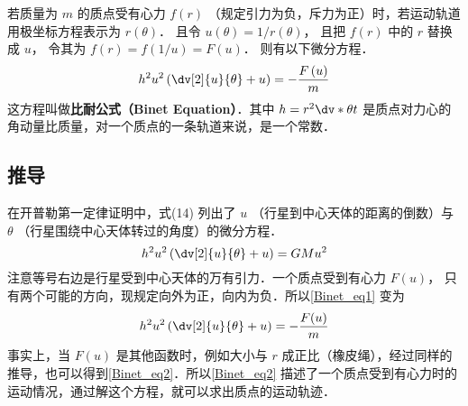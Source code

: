 

若质量为 $m$ 的质点受有心力 $f\left( r \right)$ （规定引力为负，斥力为正）时，若运动轨道用极坐标方程表示为 $r\left( \theta  \right)$． 且令 $u\left( \theta  \right) = 1/{r\left( \theta  \right)}$， 且把 $f\left( r \right)$ 中的 $r$ 替换成 $u$， 令其为
 $f\left( r \right) = f(1/u) = F\left( u \right)$． 则有以下微分方程．
 \begin{equation}
{h^2}{u^2}\left( {\dv[2]{u}{\theta} + u} \right) = -\frac{F\left( u \right)}{m}
\end{equation} 
这方程叫做\textbf{比耐公式（Binet Equation）}．其中 $h = {r^2} \dv*{\theta}{t}$ 是质点对力心的角动量比质量，对一个质点的一条轨道来说，是一个常数．

\subsection{推导}
在开普勒第一定律证明中，式(14)%
列出了 $u$ （行星到中心天体的距离的倒数）与 $\theta $ （行星围绕中心天体转过的角度）的微分方程． 
\begin{equation}\label{Binet_eq1}
{h^2}{u^2}\left( {\dv[2]{u}{\theta} + u} \right) =  GM{u^2}
\end{equation} 
注意等号右边是行星受到中心天体的万有引力．一个质点受到有心力%
 $F\left( u \right)$， 只有两个可能的方向，现规定向外为正，向内为负．所以\autoref{Binet_eq1} 变为
\begin{equation}\label{Binet_eq2}
{h^2}{u^2}\left( {\dv[2]{u}{\theta} + u} \right) = -\frac{F(u)}{m}
\end{equation} 
事实上，当 $F\left( u \right)$ 是其他函数时，例如大小与 $r$ 成正比（橡皮绳），经过同样的推导，也可以得到\autoref{Binet_eq2}．所以\autoref{Binet_eq2} 描述了一个质点受到有心力时的运动情况，通过解这个方程，就可以求出质点的运动轨迹．














